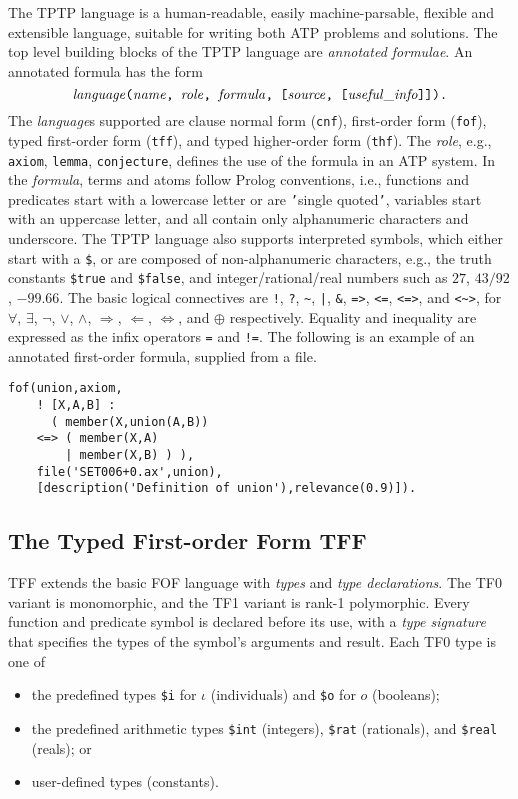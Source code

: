 \documentclass{easychair}
\begin{document}
The TPTP language is a human-readable, easily machine-parsable, flexible and
extensible language, suitable for writing both ATP problems and solutions.
The top level building blocks of the TPTP language are {\em annotated 
formulae}.
An annotated formula has the form $$\mathit{language}\text{\tt(}\mathit{name}\text{\tt, }\mathit{role}\text{\tt, }\mathit{formula}\text{\tt, [}\mathit{source}\text{\tt, [}\mathit{useful\_info}\text{\tt]]).}$$
The {\em language}s supported are clause normal form ({\tt cnf}),
first-order form ({\tt fof}), typed first-order form ({\tt tff}), and
typed higher-order form ({\tt thf}).
The {\em role}, e.g., {\tt axiom}, {\tt lemma}, {\tt conjecture},
defines the use of the formula in an ATP system.
In the {\em formula}, terms and atoms follow Prolog conventions, i.e.,
functions and predicates start with a lowercase letter or are {\tt '}single
quoted{\tt '}, variables start with an uppercase letter, and all
contain only alphanumeric characters and underscore.
The TPTP language also supports interpreted symbols, which either start with a
{\tt \$}, or are composed of non-alphanumeric characters, e.g., the truth
constants {\tt \$true} and {\tt \$false}, and integer/rational/real
numbers such as $27$, $43/92$, $-99.66$.
The basic logical connectives are
{\tt !}, {\tt ?}, {\tt \verb|~|}, {\tt |}, {\tt \&}, {\tt =>}, {\tt <=},
{\tt <=>}, and {\tt <\verb|~|>},
for
$\forall$, $\exists$, $\neg$, $\vee$, $\wedge$, $\Rightarrow$, $\Leftarrow$,
$\Leftrightarrow$, and $\oplus$ respectively.
Equality and inequality are expressed as the infix operators {\tt =} and
{\tt !=}.
The following is an example of an annotated first-order formula, supplied from a file.
\begin{verbatim}
fof(union,axiom,
    ! [X,A,B] :
      ( member(X,union(A,B))
    <=> ( member(X,A)
        | member(X,B) ) ),
    file('SET006+0.ax',union),
    [description('Definition of union'),relevance(0.9)]).
\end{verbatim}

\subsection{The Typed First-order Form TFF}
\label{TFF}

TFF extends the basic FOF language with {\em types} and {\em type
declarations}.
The TF0 variant is monomorphic, and the TF1 variant is rank-1 polymorphic.
Every function and predicate symbol is declared before its use, with
a {\em type signature} that specifies the types of the symbol's arguments
and result. Each TF0 type is one of
\begin{itemize}
\item the predefined types {\tt \$i} for $\iota$ (individuals) and
      {\tt \$o} for $o$ (booleans);
\item the predefined arithmetic types {\tt \$int} (integers), {\tt \$rat}
      (rationals), and {\tt \$real} (reals); or
\item user-defined types (constants).
\end{itemize}
\end{document}
